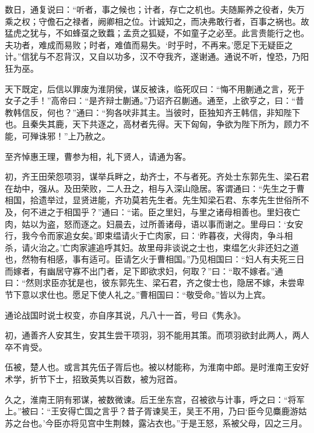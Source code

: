 \documentclass[12pt,UTF8]{ctexbook}
\begin{document}
数日，通复说曰：“听者，事之候也；计者，存亡之机也。夫随厮养之役者，失万乘之权；守儋石之禄者，阙卿相之位。计诚知之，而决弗敢行者，百事之祸也。故猛虎之犹与，不如蜂虿之致蠚；孟贲之狐疑，不如童子之必至。此言贵能行之也。夫功者，难成而易败；时者，难值而易失。‘时乎时，不再来。’愿足下无疑臣之计。”信犹与不忍背汉，又自以功多，汉不夺我齐，遂谢通。通说不听，惶恐，乃阳狂为巫。



天下既定，后信以罪废为淮阴侯，谋反被诛，临死叹曰：“悔不用蒯通之言，死于女子之手！”高帝曰：“是齐辩士蒯通。”乃诏齐召蒯通。通至，上欲亨之，曰：“昔教韩信反，何也？”通曰：“狗各吠非其主。当彼时，臣独知齐王韩信，非知陛下也。且秦失其鹿，天下共逐之，高材者先得。天下匈匈，争欲为陛下所为，顾力不能，可殚诛邪！”上乃赦之。



至齐悼惠王理，曹参为相，礼下贤人，请通为客。



初，齐王田荣怨项羽，谋举兵畔之，劫齐士，不与者死。齐处士东郭先生、梁石君在劫中，强从。及田荣败，二人丑之，相与入深山隐居。客谓通曰：“先生之于曹相国，拾遗举过，显贤进能，齐功莫若先生者。先生知梁石君、东孝先生世俗所不及，何不进之于相国乎？”通曰：“诺。臣之里妇，与里之诸母相善也。里妇夜亡肉，姑以为盗，怒而逐之。妇晨去，过所善诸母，语以事而谢之。里母曰：‘女安行，我今令而家追女矣。’即束缊请火于亡肉家，曰：‘昨暮夜，犬得肉，争斗相杀，请火治之。’亡肉家遽追呼其妇。故里母非谈说之士也，束缊乞火非还妇之道也，然物有相感，事有适可。臣请乞火于曹相国。”乃见相国曰：“妇人有夫死三日而嫁者，有幽居守寡不出门者，足下即欲求妇，何取？”曰：“取不嫁者。”通曰：“然则求臣亦犹是也，彼东郭先生、梁石君，齐之俊士也，隐居不嫁，未尝卑节下意以求仕也。愿足下使人礼之。”曹相国曰：“敬受命。”皆以为上宾。



通论战国时说士权变，亦自序其说，凡八十一首，号曰《隽永》。



初，通善齐人安其生，安其生尝干项羽，羽不能用其策。而项羽欲封此两人，两人卒不肯受。



伍被，楚人也。或言其先伍子胥后也。被以材能称，为淮南中郎。是时淮南王安好术学，折节下士，招致英隽以百数，被为冠首。



久之，淮南王阴有邪谋，被数微谏。后王坐东宫，召被欲与计事，呼之曰：“将军上。”被曰：“王安得亡国之言乎？昔子胥谏吴王，吴王不用，乃曰‘臣今见麋鹿游姑苏之台也。’今臣亦将见宫中生荆棘，露沾衣也。”于是王怒，系被父母，囚之三月。
\end{document}
